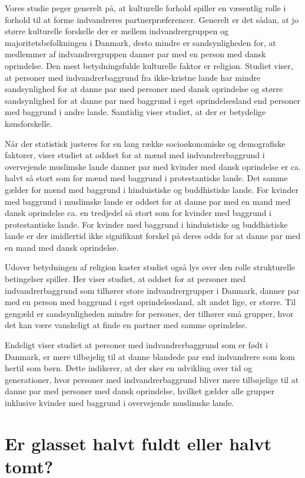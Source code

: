 \documentclass[
]{book}
\begin{document}
Vores studie peger generelt på, at kulturelle forhold spiller en væsentlig rolle i forhold til at forme indvandreres partnerpræferencer. Generelt er det sådan, at jo større kulturelle forskelle der er mellem indvandrergruppen og majoritetsbefolkningen i Danmark, desto mindre er sandsynligheden for, at medlemmer af indvandrergruppen danner par med en person med dansk oprindelse. Den mest betydningsfulde kulturelle faktor er religion. Studiet viser, at personer med indvandrerbaggrund fra ikke-kristne lande har mindre sandsynlighed for at danne par med personer med dansk oprindelse og større sandsynlighed for at danne par med baggrund i eget oprindelsesland end personer med baggrund i andre lande. Samtidig viser studiet, at der er betydelige kønsforskelle.

Når der statistisk justeres for en lang række socioøkonomiske og demografiske faktorer, viser studiet at oddset for at mænd med indvandrerbaggrund i overvejende muslimske lande danner par med kvinder med dansk oprindelse er ca. halvt så stort som for mænd med baggrund i protestantiske lande. Det samme gælder for mænd med baggrund i hinduistiske og buddhistiske lande. For kvinder med baggrund i muslimske lande er oddset for at danne par med en mand med dansk oprindelse ca. en tredjedel så stort som for kvinder med baggrund i protestantiske lande. For kvinder med baggrund i hinduistiske og buddhistiske lande er der imidlertid ikke signifikant forskel på deres odds for at danne par med en mand med dansk oprindelse.

Udover betydningen af religion kaster studiet også lys over den rolle strukturelle betingelser spiller. Her viser studiet, at oddset for at personer med indvandrerbaggrund som tilhører store indvandrergrupper i Danmark, danner par med en person med baggrund i eget oprindelsesland, alt andet lige, er større. Til gengæld er sandsynligheden mindre for personer, der tilhører små grupper, hvor det kan være vanskeligt at finde en partner med samme oprindelse.

Endeligt viser studiet at personer med indvandrerbaggrund som er født i Danmark, er mere tilbøjelig til at danne blandede par end indvandrere som kom hertil som børn. Dette indikerer, at der sker en udvikling over tid og generationer, hvor personer med indvandrerbaggrund bliver mere tilbøjelige til at danne par med personer med dansk oprindelse, hvilket gælder alle grupper inklusive kvinder med baggrund i overvejende muslimske lande.

\section{Er glasset halvt fuldt eller halvt tomt?}\label{er-glasset-halvt-fuldt-eller-halvt-tomt}
\end{document}
